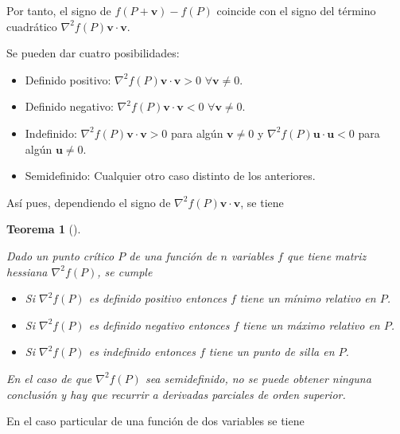 \documentclass[
  a4paper,
]{scrreport}
\providecommand{\tightlist}{%
  \setlength{\itemsep}{0pt}\setlength{\parskip}{0pt}}\usepackage{longtable,booktabs,array}
\theoremstyle{plain}
\newtheorem{theorem}{Teorema}[chapter]
\theoremstyle{definition}
\theoremstyle{plain}
\theoremstyle{plain}
\theoremstyle{definition}
\theoremstyle{definition}
\theoremstyle{remark}
\begin{document}
Por tanto, el signo de \(f(P+\mathbf{v})-f(P)\) coincide con el signo
del término cuadrático \(\nabla^2f(P)\mathbf{v}\cdot\mathbf{v}\).

Se pueden dar cuatro posibilidades:

\begin{itemize}
\tightlist
\item
  Definido positivo: \(\nabla^2f(P)\mathbf{v}\cdot\mathbf{v}>0\)
  \(\forall \mathbf{v}\neq 0\).
\item
  Definido negativo: \(\nabla^2f(P)\mathbf{v}\cdot\mathbf{v}<0\)
  \(\forall \mathbf{v}\neq 0\).
\item
  Indefinido: \(\nabla^2f(P)\mathbf{v}\cdot\mathbf{v}>0\) para algún
  \(\mathbf{v}\neq 0\) y \(\nabla^2f(P)\mathbf{u}\cdot\mathbf{u}<0\)
  para algún \(\mathbf{u}\neq 0\).
\item
  Semidefinido: Cualquier otro caso distinto de los anteriores.
\end{itemize}

Así pues, dependiendo el signo de
\(\nabla^2f(P)\mathbf{v}\cdot\mathbf{v}\), se tiene

\begin{theorem}[]\protect\hypertarget{thm-extremos-funcion-varias-variables}{}\label{thm-extremos-funcion-varias-variables}

Dado un punto crítico \(P\) de una función de \(n\) variables \(f\) que
tiene matriz hessiana \(\nabla^2 f(P)\), se cumple

\begin{itemize}
\tightlist
\item
  Si \(\nabla^2f(P)\) es definido positivo entonces \(f\) tiene un
  \emph{mínimo relativo} en \(P\).
\item
  Si \(\nabla^2f(P)\) es definido negativo entonces \(f\) tiene un
  \emph{máximo relativo} en \(P\).
\item
  Si \(\nabla^2f(P)\) es indefinido entonces \(f\) tiene un \emph{punto
  de silla} en \(P\).
\end{itemize}

En el caso de que \(\nabla^2f(P)\) sea semidefinido, no se puede obtener
ninguna conclusión y hay que recurrir a derivadas parciales de orden
superior.

\end{theorem}

En el caso particular de una función de dos variables se tiene
\end{document}
